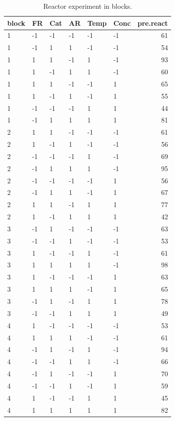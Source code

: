 \documentclass[
]{book}
\theoremstyle{definition}
\theoremstyle{definition}
\theoremstyle{definition}
\theoremstyle{definition}
\theoremstyle{remark}
\begin{document}
\begin{table}

\caption{\label{tab:block-assign}Reactor experiment in blocks.}
\centering
\begin{tabular}[t]{l|l|l|l|l|l|r}
\hline
block & FR & Cat & AR & Temp & Conc & pre.react\\
\hline
1 & -1 & -1 & -1 & -1 & -1 & 61\\
\hline
1 & -1 & 1 & 1 & -1 & -1 & 54\\
\hline
1 & 1 & 1 & -1 & 1 & -1 & 93\\
\hline
1 & 1 & -1 & 1 & 1 & -1 & 60\\
\hline
1 & 1 & 1 & -1 & -1 & 1 & 65\\
\hline
1 & 1 & -1 & 1 & -1 & 1 & 55\\
\hline
1 & -1 & -1 & -1 & 1 & 1 & 44\\
\hline
1 & -1 & 1 & 1 & 1 & 1 & 81\\
\hline
2 & 1 & 1 & -1 & -1 & -1 & 61\\
\hline
2 & 1 & -1 & 1 & -1 & -1 & 56\\
\hline
2 & -1 & -1 & -1 & 1 & -1 & 69\\
\hline
2 & -1 & 1 & 1 & 1 & -1 & 95\\
\hline
2 & -1 & -1 & -1 & -1 & 1 & 56\\
\hline
2 & -1 & 1 & 1 & -1 & 1 & 67\\
\hline
2 & 1 & 1 & -1 & 1 & 1 & 77\\
\hline
2 & 1 & -1 & 1 & 1 & 1 & 42\\
\hline
3 & -1 & 1 & -1 & -1 & -1 & 63\\
\hline
3 & -1 & -1 & 1 & -1 & -1 & 53\\
\hline
3 & 1 & -1 & -1 & 1 & -1 & 61\\
\hline
3 & 1 & 1 & 1 & 1 & -1 & 98\\
\hline
3 & 1 & -1 & -1 & -1 & 1 & 63\\
\hline
3 & 1 & 1 & 1 & -1 & 1 & 65\\
\hline
3 & -1 & 1 & -1 & 1 & 1 & 78\\
\hline
3 & -1 & -1 & 1 & 1 & 1 & 49\\
\hline
4 & 1 & -1 & -1 & -1 & -1 & 53\\
\hline
4 & 1 & 1 & 1 & -1 & -1 & 61\\
\hline
4 & -1 & 1 & -1 & 1 & -1 & 94\\
\hline
4 & -1 & -1 & 1 & 1 & -1 & 66\\
\hline
4 & -1 & 1 & -1 & -1 & 1 & 70\\
\hline
4 & -1 & -1 & 1 & -1 & 1 & 59\\
\hline
4 & 1 & -1 & -1 & 1 & 1 & 45\\
\hline
4 & 1 & 1 & 1 & 1 & 1 & 82\\
\hline
\end{tabular}
\end{table}
\end{document}
